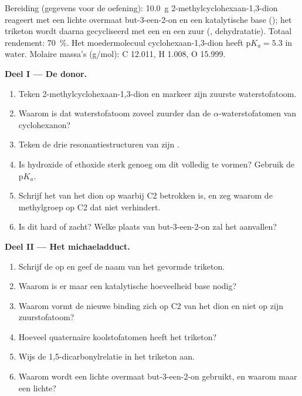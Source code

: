 \begin{problem}
\label{pb:b2:conjugate-additions:1}
Bereiding (gegevens voor de oefening): \qty{10.0}{g} 2-methylcyclohexaan-1,3-dion reageert met een lichte overmaat
but-3-een-2-on en een katalytische base (); het triketon wordt daarna gecycliseerd met een
 en een zuur (, dehydratatie). Totaal rendement: 70~\%. Het moedermolecuul cyclohexaan-1,3-dion
heeft $\mathrm pK_a = 5.3$ in water. Molaire massa's (\unit{g/mol}): C 12.011, H 1.008, O 15.999.

\medskip
\noindent\textbf{Deel I --- De donor.}
\begin{enumerate}
  \item Teken 2-methylcyclohexaan-1,3-dion en markeer zijn zuurste waterstofatoom.
  \item Waarom is dat waterstofatoom zoveel zuurder dan de $\alpha$-waterstofatomen van cyclohexanon?
  \item Teken de drie resonantiestructuren van zijn .
  \item Is hydroxide of ethoxide sterk genoeg om dit  volledig te vormen? Gebruik de $\mathrm pK_a$.
  \item Schrijf het  van het dion op waarbij C2 betrokken is, en zeg waarom de methylgroep op C2 dat
        niet verhindert.
  \item Is dit  hard of zacht? Welke plaats van but-3-een-2-on zal het aanvallen?
\end{enumerate}

\medskip
\noindent\textbf{Deel II --- Het michaeladduct.}
\begin{enumerate}[resume]
  \item Schrijf de  op en geef de naam van het gevormde triketon.
  \item Waarom is er maar een katalytische hoeveelheid base nodig?
  \item Waarom vormt de nieuwe binding zich op C2 van het dion en niet op zijn zuurstofatoom?
  \item Hoeveel quaternaire koolstofatomen heeft het triketon?
  \item Wijs de 1,5-dicarbonylrelatie in het triketon aan.
  \item Waarom wordt een lichte overmaat but-3-een-2-on gebruikt, en waarom maar een lichte?
\end{enumerate}


\end{problem}
